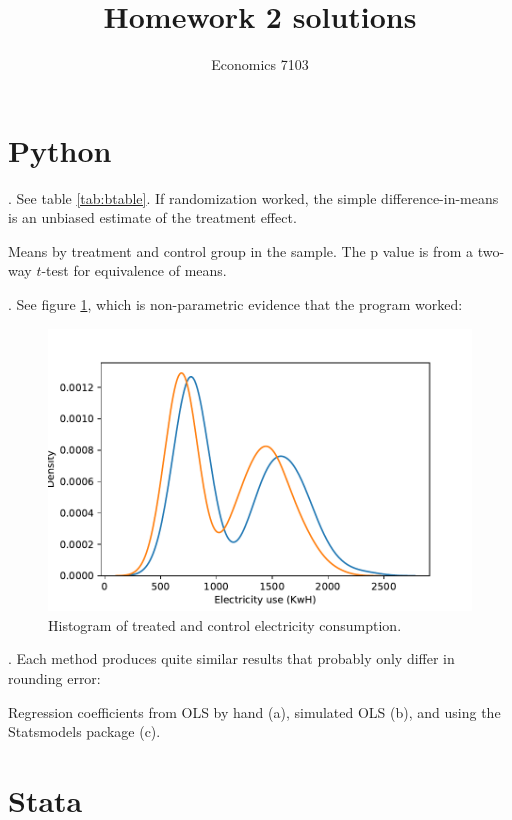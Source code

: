 \documentclass{article}
\title{Homework 2 solutions}
\author{Economics 7103}
\date{ }
\begin{document}
  
\maketitle

\section{Python}
. See table \ref{tab:btable}.  If randomization worked, the simple difference-in-means is an unbiased estimate of the treatment effect.
\begin{table}[h]
    \centering
    
    \caption{Means by treatment and control group in the sample.  The p value is from a two-way $t$-test for equivalence of means.}
    \label{tab:btable}
\end{table}

. See figure \ref{fig:treatmenthist}, which is non-parametric evidence that the program worked:
\begin{figure}[h]
    \centering
    \includegraphics[scale=0.7]{treatmenthist.pdf}
    \caption{Histogram of treated and control electricity consumption.}
    \label{fig:treatmenthist}
\end{figure}

. Each method produces quite similar results that probably only differ in rounding error:
\begin{table}[h]
    \centering
   
    \caption{Regression coefficients from OLS by hand (a), simulated OLS (b), and using the Statsmodels package (c).}
    \label{tab:outputtable3}
\end{table}
\section{Stata}
\end{document}
